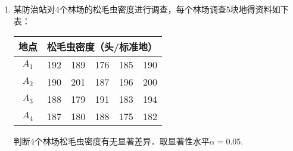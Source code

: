 \documentclass[10pt,a4paper]{article}
\begin{document}
\begin{enumerate}
    \item 某防治站对4个林场的松毛虫密度进行调查，每个林场调查5块地得资料如下表：
    \renewcommand{\arraystretch}{1.3}
    \begin{table}[H]\centering
        \begin{tabular}{cccccc}
        \hline
        地点    & \multicolumn{5}{c}{松毛虫密度（头/标准地）} \\ \hline
        $A_1$ & 192  & 189  & 176  & 185  & 190  \\
        $A_2$ & 190  & 201  & 187  & 196  & 200  \\
        $A_3$ & 188  & 179  & 191  & 183  & 194  \\
        $A_4$ & 187  & 180  & 188  & 175  & 182  \\ \hline
        \end{tabular}
        \end{table}
    判断4个林场松毛虫密度有无显著差异．取显著性水平$\alpha=0.05$.
    \renewcommand{\arraystretch}{1.0}
    











  

\end{enumerate}
\end{document}
